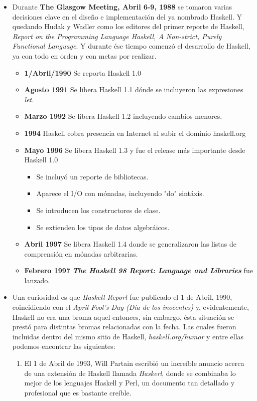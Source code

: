 \documentclass{article}
\begin{document}
\begin{itemize}
	\item Durante \textbf{The Glasgow Meeting, Abril 6-9, 1988} se tomaron varias decisiones clave en el diseño e implementación del ya nombrado Haskell. Y quedando Hudak y Wadler como los editores del primer reporte de Haskell, \textit{Report on the Programming Language Haskell, A Non-strict, Purely Functional Language}. Y durante ése tiempo comenzó el desarrollo de Haskell, ya con todo en orden y con metas por realizar.
		\begin{itemize}
			\item \textbf{1/Abril/1990} Se reporta Haskell 1.0 
			\item \textbf{Agosto 1991} Se libera Haskell 1.1 dónde se incluyeron las expresiones \textit{let}.
			\item \textbf{Marzo 1992} Se libera Haskell 1.2 incluyendo cambios menores.
			\item \textbf{1994} Haskell cobra presencia en Internet al subir el dominio haskell.org
			\item \textbf{Mayo 1996} Se libera Haskell 1.3 y fue el release más importante desde Haskell 1.0
				\begin{itemize}
					\item Se incluyó un reporte de bibliotecas.
					\item Aparece el I/O con mónadas, incluyendo "do" sintáxis.
					\item Se introducen los constructores de clase.
					\item Se extienden los tipos de datos algebráicos.
				\end{itemize}
			\item \textbf{Abril 1997} Se libera Haskell 1.4 donde se generalizaron las listas de comprensión en mónadas arbitrarias.
			\item \textbf{Febrero 1997} \textbf{\textit{The Haskell 98 Report: Language and Libraries}} fue lanzado.
		\end{itemize}
		\item Una curiosidad es que \textit{Haskell Report} fue publicado el 1 de Abril, 1990, coincidiendo con el \textit{April Fool's Day (Día de los inocentes)} y, evidentemente, Haskell no era una broma aquel entonces, sin embargo, ésta situación se prestó para distintas bromas relacionadas con la fecha. Las cuales fueron incluidas dentro del mismo sitio de Haskell, \textit{haskell.org/humor} y entre ellas podemos encontrar las siguientes: 
		\begin{enumerate}
			\item El 1 de Abril de 1993, Will Partain escribió un increíble anuncio acerca de una extensión de Haskell llamada \textit{Haskerl}, donde se combinaba lo mejor de los lenguajes Haskell y Perl, un documento tan detallado y profesional que es bastante creíble.

\end{enumerate}
\end{itemize}
\end{document}
